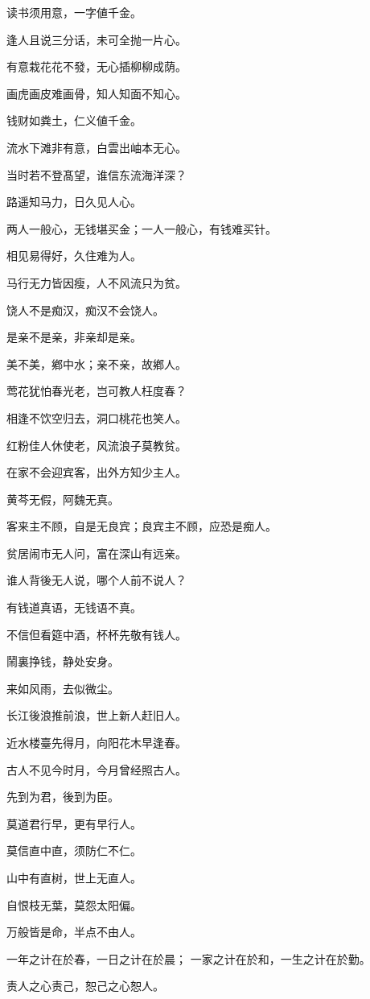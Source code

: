 \documentclass[12pt,oneside]{book}
\begin{document}
读书须用意，一字値千金。

逢人且说三分话，未可全抛一片心。

有意栽花花不發，无心插柳柳成荫。

画虎画皮难画骨，知人知面不知心。

钱财如粪土，仁义値千金。

流水下滩非有意，白雲出岫本无心。

当时若不登髙望，谁信东流海洋深？

路遥知马力，日久见人心。

两人一般心，无钱堪买金；一人一般心，有钱难买针。

相见易得好，久住难为人。

马行无力皆因瘦，人不风流只为贫。

饶人不是痴汉，痴汉不会饶人。

是亲不是亲，非亲却是亲。

美不美，鄕中水；亲不亲，故鄕人。

莺花犹怕春光老，岂可教人枉度春？

相逢不饮空归去，洞口桃花也笑人。

红粉佳人休使老，风流浪子莫教贫。

在家不会迎宾客，出外方知少主人。

黄芩无假，阿魏无真。

客来主不顾，自是无良宾；良宾主不顾，应恐是痴人。

贫居闹市无人问，富在深山有远亲。

谁人背後无人说，哪个人前不说人？

有钱道真语，无钱语不真。

不信但看筵中酒，杯杯先敬有钱人。

鬧裏挣钱，静处安身。

来如风雨，去似微尘。

长江後浪推前浪，世上新人赶旧人。

近水楼臺先得月，向阳花木早逢春。

古人不见今时月，今月曾经照古人。

先到为君，後到为臣。

莫道君行早，更有早行人。

莫信直中直，须防仁不仁。

山中有直树，世上无直人。

自恨枝无葉，莫怨太阳偏。

万般皆是命，半点不由人。

一年之计在於春，一日之计在於晨；
一家之计在於和，一生之计在於勤。

责人之心责己，恕己之心恕人。
\end{document}
